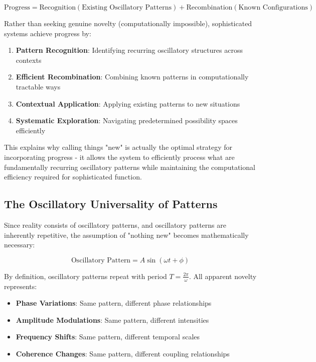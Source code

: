 \documentclass[11pt]{article}
\theoremstyle{remark}
\begin{document}
$$\text{Progress} = \text{Recognition}(\text{Existing Oscillatory Patterns}) + \text{Recombination}(\text{Known Configurations})$$

Rather than seeking genuine novelty (computationally impossible), sophisticated systems achieve progress by:

\begin{enumerate}
\item \textbf{Pattern Recognition}: Identifying recurring oscillatory structures across contexts
\item \textbf{Efficient Recombination}: Combining known patterns in computationally tractable ways
\item \textbf{Contextual Application}: Applying existing patterns to new situations
\item \textbf{Systematic Exploration}: Navigating predetermined possibility spaces efficiently
\end{enumerate}

This explains why calling things "new" is actually the optimal strategy for incorporating progress - it allows the system to efficiently process what are fundamentally recurring oscillatory patterns while maintaining the computational efficiency required for sophisticated function.

\subsection{The Oscillatory Universality of Patterns}

Since reality consists of oscillatory patterns, and oscillatory patterns are inherently repetitive, the assumption of "nothing new" becomes mathematically necessary:

$$\text{Oscillatory Pattern} = A \sin(\omega t + \phi)$$

By definition, oscillatory patterns repeat with period $T = \frac{2\pi}{\omega}$. All apparent novelty represents:

\begin{itemize}
\item \textbf{Phase Variations}: Same pattern, different phase relationships
\item \textbf{Amplitude Modulations}: Same pattern, different intensities  
\item \textbf{Frequency Shifts}: Same pattern, different temporal scales
\item \textbf{Coherence Changes}: Same pattern, different coupling relationships
\end{itemize}
\end{document}
